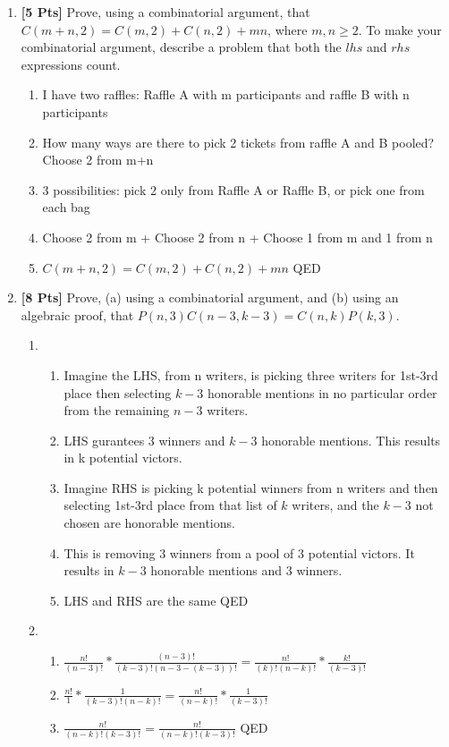 \documentclass[11pt]{article}
\begin{document}
    \begin{enumerate}

        \item {\bf [5 Pts]} Prove, using a combinatorial argument, that $C(m+n, 2) = C(m,2) + C(n,2) + mn$, where $m,n \geq 2$. To make your combinatorial argument, describe a problem that both the $lhs$ and $rhs$ expressions count.
        \begin{enumerate}
            \item I have two raffles: Raffle A with m participants and raffle B with n participants
            \item How many ways are there to pick 2 tickets from raffle A and B pooled? Choose 2 from m+n
            \item 3 possibilities: pick 2 only from Raffle A or Raffle B, or pick one from each bag
            \item Choose 2 from m + Choose 2 from n + Choose 1 from m and 1 from n
            \item $C(m+n, 2) = C(m,2) + C(n,2) + mn$ \null\hfill QED
        \end{enumerate}

        \item {\bf [8 Pts]} Prove, (a) using a combinatorial argument, and (b) using an algebraic proof, that $P(n,3) C(n-3, k-3) = C(n,k) P(k,3)$.
        \begin{enumerate}
            \item
            \begin{enumerate}
                \item Imagine the LHS, from n writers, is picking three writers for 1st-3rd place then selecting $k - 3$ honorable mentions in no particular order from the remaining $n - 3$ writers.
                \item LHS gurantees 3 winners and $k - 3$ honorable mentions. This results in k potential victors.
                \item Imagine RHS is picking k potential winners from n writers and then selecting 1st-3rd place from that list of $k$ writers, and the $k - 3$ not chosen are honorable mentions.
                \item This is removing 3 winners from a pool of 3 potential victors. It results in $k - 3$ honorable mentions and 3 winners.
                \item LHS and RHS are the same \null\hfill QED
            \end{enumerate}
            \item
            \begin{enumerate}
                \item $\frac{n!}{(n-3)!}*\frac{(n-3)!}{(k-3)!(n-3-(k-3))!} = \frac{n!}{(k)!(n-k)!}*\frac{k!}{(k-3)!}$
                \item $\frac{n!}{1}*\frac{1}{(k-3)!(n-k)!} = \frac{n!}{(n-k)!}*\frac{1}{(k-3)!}$
                \item $\frac{n!}{(n-k)!(k-3)!} = \frac{n!}{(n-k)!(k-3)!}$ \null\hfill QED
            \end{enumerate}
        \end{enumerate}
        \newpage


\end{enumerate}
\end{document}
